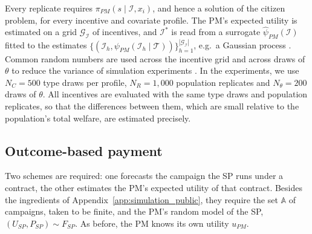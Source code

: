 \documentclass[12pt]{article}
\begin{document}
Every replicate requires $\pi_{PM}(s \mid \mathcal{I}, x_i)$, and hence a solution of the citizen problem, for every incentive and covariate profile. The PM's expected utility is estimated on a grid $\mathcal{G}_{\mathcal{I}}$ of incentives, and $\mathcal{I}^*$ is read from a surrogate $\widehat{\psi}_{PM}(\mathcal{I})$ fitted to the estimates $\{(\mathcal{I}_h, \psi_{PM}(\mathcal{I}_h \mid \mathcal{T}))\}_{h=1}^{|\mathcal{G}_{\mathcal{I}}|}$, e.g.\ a Gaussian process \citep{gramacy2020surrogates}. Common random numbers are used across the incentive grid and across draws of $\theta$ to reduce the variance of simulation experiments \citep{law1991simulation}. In the experiments, we use $N_C = 500$ type draws per profile, $N_R = 1{,}000$ population replicates and $N_\theta = 200$ draws of $\theta$. All incentives are evaluated with the same type draws and population replicates, so that the differences between them, which are small relative to the population's total welfare, are estimated precisely.


\subsection{Outcome-based payment}\label{app:simulation_OBP}
Two schemes are required: one forecasts the campaign the SP runs under a contract, the other estimates the PM's expected utility of that contract. Besides the ingredients of Appendix~\ref{app:simulation_public}, they require the set $\mathbb{A}$ of campaigns, taken to be finite, and the PM's random model of the SP, $(U_{SP}, P_{SP}) \sim F_{SP}$. As before, the PM knows its own utility $u_{PM}$.
\end{document}
